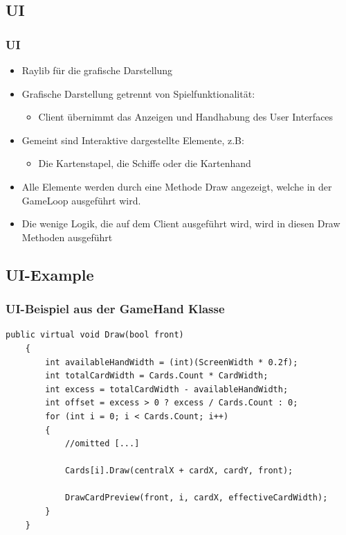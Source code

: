 \documentclass{beamer}
\begin{document}
\subsection{UI}
\begin{frame}
  \frametitle{UI}
  \begin{itemize}
    \item Raylib für die grafische Darstellung
    \item Grafische Darstellung getrennt von Spielfunktionalität:
      \begin{itemize}
        \item Client übernimmt das Anzeigen und Handhabung des User Interfaces 
      \end{itemize}
    \item Gemeint sind Interaktive dargestellte Elemente, z.B:
    \begin{itemize}
      \item Die Kartenstapel, die Schiffe oder die Kartenhand
    \end{itemize}
    \item Alle Elemente werden durch eine Methode Draw angezeigt, welche in der GameLoop ausgeführt wird.
    \item Die wenige Logik, die auf dem Client ausgeführt wird, wird in diesen Draw Methoden ausgeführt
  \end{itemize} 
\end{frame}

\subsection{UI-Example}
\begin{frame}[fragile]
  \frametitle{UI-Beispiel aus der GameHand Klasse}
  \begin{lstlisting}[language=CSharp]
    public virtual void Draw(bool front)
    {
        int availableHandWidth = (int)(ScreenWidth * 0.2f);
        int totalCardWidth = Cards.Count * CardWidth;
        int excess = totalCardWidth - availableHandWidth;
        int offset = excess > 0 ? excess / Cards.Count : 0;
        for (int i = 0; i < Cards.Count; i++)
        {
            //omitted [...]

            Cards[i].Draw(centralX + cardX, cardY, front);

            DrawCardPreview(front, i, cardX, effectiveCardWidth);
        }
    }
  \end{lstlisting}
\end{frame}
\end{document}
